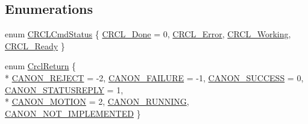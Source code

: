 \subsection*{Enumerations}
\begin{DoxyCompactItemize}
\item 
enum \hyperlink{namespaceCrcl_a5433cc9af1949d6f1305896f70a25eb2}{C\-R\-C\-L\-Cmd\-Status} \{ \hyperlink{namespaceCrcl_a5433cc9af1949d6f1305896f70a25eb2a9ea47a762991d75df7a42371b5cca334}{C\-R\-C\-L\-\_\-\-Done} = 0, 
\hyperlink{namespaceCrcl_a5433cc9af1949d6f1305896f70a25eb2aa4b171b9476a14e5f618445ea9bf0eef}{C\-R\-C\-L\-\_\-\-Error}, 
\hyperlink{namespaceCrcl_a5433cc9af1949d6f1305896f70a25eb2ad556078682b7d707f43b0d124b034b98}{C\-R\-C\-L\-\_\-\-Working}, 
\hyperlink{namespaceCrcl_a5433cc9af1949d6f1305896f70a25eb2aaab13fab6143bf57d4c1b34eba7becff}{C\-R\-C\-L\-\_\-\-Ready}
 \}
\item 
enum \hyperlink{namespaceCrcl_a1ed3b29723118a020251dde9b12733c0}{Crcl\-Return} \{ \\*
\hyperlink{namespaceCrcl_a1ed3b29723118a020251dde9b12733c0a8ba59e3e99680c229d1c20bc56aaf355}{C\-A\-N\-O\-N\-\_\-\-R\-E\-J\-E\-C\-T} = -\/2, 
\hyperlink{namespaceCrcl_a1ed3b29723118a020251dde9b12733c0abf41e0170807e238ca1716811f0a395e}{C\-A\-N\-O\-N\-\_\-\-F\-A\-I\-L\-U\-R\-E} = -\/1, 
\hyperlink{namespaceCrcl_a1ed3b29723118a020251dde9b12733c0af9001172ed075345641fbb95a818e0da}{C\-A\-N\-O\-N\-\_\-\-S\-U\-C\-C\-E\-S\-S} = 0, 
\hyperlink{namespaceCrcl_a1ed3b29723118a020251dde9b12733c0af8040d4fa18254e17c0e5b1893ba8859}{C\-A\-N\-O\-N\-\_\-\-S\-T\-A\-T\-U\-S\-R\-E\-P\-L\-Y} = 1, 
\\*
\hyperlink{namespaceCrcl_a1ed3b29723118a020251dde9b12733c0a8044ac4052e4558e22c5be516d106204}{C\-A\-N\-O\-N\-\_\-\-M\-O\-T\-I\-O\-N} = 2, 
\hyperlink{namespaceCrcl_a1ed3b29723118a020251dde9b12733c0afdcee8c4e0e747aa30452b835fd1380a}{C\-A\-N\-O\-N\-\_\-\-R\-U\-N\-N\-I\-N\-G}, 
\hyperlink{namespaceCrcl_a1ed3b29723118a020251dde9b12733c0a7e627586bca4ce3863e89ebcd7a55c74}{C\-A\-N\-O\-N\-\_\-\-N\-O\-T\-\_\-\-I\-M\-P\-L\-E\-M\-E\-N\-T\-E\-D}
 \}
\end{DoxyCompactItemize}
